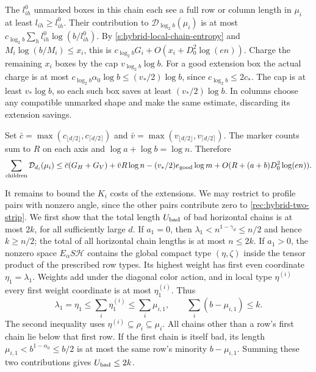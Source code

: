 The $l^0_{ih}$ unmarked boxes in this chain each see a full row or
column length in $\mu_i$ at least $l_{ih}\ge l^0_{ih}$.
Their contribution to $\mathcal D_{\log_2 b}(\mu_i)$ is at most
$c_{\log_2 b}\sum_hl^0_{ih}\log(b/l^0_{ih})$. By
\eqref{s:hybrid-local-chain-entropy} and
$M_i\log(b/M_i)\le x_i$, this is
$c_{\log_2 b}G_i+O(x_i+D_0^2\log(en))$.
Charge the remaining $x_i$ boxes by the cap
$v_{\log_2 b}\log b$. For a good extension box the actual charge
is at most
$c_{\log_2 b}\alpha_0\log b\le(v_*/2)\log b$,
since $c_{\log_2 b}\le2c_*$. The cap is at least $v_*\log b$,
so each such box saves at least $(v_*/2)\log b$.
In columns choose any compatible unmarked shape and make the same
estimate, discarding its extension savings.

Set
$\bar c=\max(c_{\lfloor d/2\rfloor},c_{\lceil d/2\rceil})$ and
$\bar v=\max(v_{\lfloor d/2\rfloor},v_{\lceil d/2\rceil})$.
The marker counts sum to $R$ on each axis and
$\log a+\log b=\log n$. Therefore
\begin{equation}\label{rec:hybrid-child-diagram}
 \sum_{\rm children}\mathcal D_{d_i}(\mu_i)
 \le\bar c(G_H+G_V)+\bar vR\log n
   -(v_*/2)e_{\rm good}\log m
   +O(R+(a+b)D_0^2\log(en)).
\end{equation}

It remains to bound the $K_i$ costs of the extensions.
We may restrict to profile pairs with nonzero angle, since the other
pairs contribute zero to \eqref{rec:hybrid-two-strip}.
We first show that the total length $U_{\rm bad}$ of bad horizontal
chains is at most $2k$, for all sufficiently large $d$.
If $a_1=0$, then $\lambda_1<n^{1-\gamma_d}\le n/2$ and hence
$k\ge n/2$; the total of all horizontal chain lengths is at most
$n\le2k$.
If $a_1>0$, the nonzero space $E_\alpha S\mathcal H$ contains the
global compact type $(\eta,\zeta)$ inside the tensor product of
the prescribed row types. Its highest weight has first even
coordinate $\eta_1=\lambda_1$. Weights add under the diagonal color
action, and in local type $\eta^{(i)}$ every first weight coordinate is
at most $\eta^{(i)}_1$. Thus
\[
 \lambda_1=\eta_1\le\sum_i\eta^{(i)}_1
                  \le\sum_i\mu_{i,1},\qquad
 \sum_i(b-\mu_{i,1})\le k.
\]
The second inequality uses $\eta^{(i)}\subseteq\rho_i\subseteq\mu_i$.
All chains other than a row's first chain lie below that first row.
If the first chain is itself bad, its length
$\mu_{i,1}<b^{1-\alpha_0}\le b/2$ is at most the same row's
minority $b-\mu_{i,1}$. Summing these two contributions gives
$U_{\rm bad}\le2k$.

